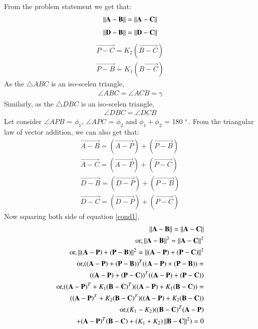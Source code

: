 \documentclass[journal,12pt,twocolumn]{IEEEtran}
\begin{document}
From the problem statement we get that:
\begin{equation}
\begin{aligned}
\left\lVert\mathbf{A}-\mathbf{B}\right\rVert = \left\lVert\mathbf{A}-\mathbf{C}\right\rVert
\end{aligned}
\end{equation}
\label{cond1}
\begin{align}
\left\lVert\mathbf{D}-\mathbf{B}\right\rVert = \left\lVert\mathbf{D}-\mathbf{C}\right\rVert
\end{align}
\label{cond2}
\begin{align}
\vec{P-C} = K_2 (\vec{B-C})\\
\vec{P-B} = K_1 (\vec{B-C})
\end{align}
As the $\triangle ABC$ is an iso-scelen triangle,
\begin{align}
\angle ABC = \angle ACB =\gamma
\end{align}
Similarly, as the $\triangle DBC$ is an iso-scelen triangle,
\begin{align}
\angle DBC = \angle DCB 
\end{align}
Let consider $\angle APB$ = $\phi_1$, $\angle APC$ = $\phi_2$ and $\phi_1 + \phi_2$ = 180 $\degree$.
From the triangular law of vector addition, we can also get that:
\begin{align}
\vec{A-B} = (\vec{A-P}) + (\vec{P-B})\\
\vec{A-C} = (\vec{A-P}) + (\vec{P-C})\\
\vec{D-B} = (\vec{D-P}) + (\vec{P-B})\\
\vec{D-C} = (\vec{D-P}) + (\vec{P-C})
\end{align}
Now squaring both side of equation \ref{cond1}, 
\begin{align}
\left\lVert\mathbf{A}-\mathbf{B}\right\rVert =\left\lVert\mathbf{A}-\mathbf{C}\right\rVert\\
\text{or,}\left\lVert\mathbf{A}-\mathbf{B}\right\rVert^2 = \left\lVert\mathbf{A}-\mathbf{C}\right\rVert^2\\
\text{or,}\left\lVert(\mathbf{A-P}) + (\mathbf{P-B})\right\rVert^2 = \left\lVert(\mathbf{A-P}) + (\mathbf{P-C})\right\rVert^2\\
\text{or,}((\mathbf{A-P}) + (\mathbf{P-B}))^T ((\mathbf{A-P}) + (\mathbf{P-B})) =\\
 ((\mathbf{A-P}) + (\mathbf{P-C}))^T ((\mathbf{A-P}) + (\mathbf{P-C}))\\
\text{or,}((\mathbf{A-P})^T + K_1(\mathbf{B-C})^T)((\mathbf{A-P}) + K_1(\mathbf{B-C})) =\\
((\mathbf{A-P})^T + K_2(\mathbf{B-C})^T)((\mathbf{A-P}) + K_2(\mathbf{B-C}))\\
\text{or,} (K_1 - K_2)((\mathbf{B-C})^T (\mathbf{A-P}) \\
+ (\mathbf{A-P})^T (\mathbf{B-C}) + (K_1 + K_2)\left\lVert\mathbf{B-C}\right\rVert^2)=0
\end{align}
\end{document}
